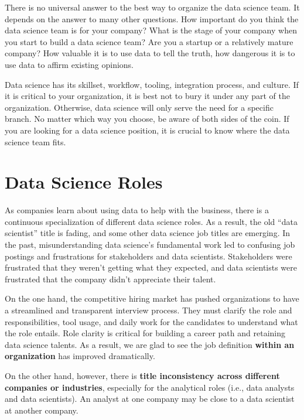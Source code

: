 \documentclass[
  12pt,
]{krantz}
\begin{document}
There is no universal answer to the best way to organize the data science team. It depends on the answer to many other questions. How important do you think the data science team is for your company? What is the stage of your company when you start to build a data science team? Are you a startup or a relatively mature company? How valuable it is to use data to tell the truth, how dangerous it is to use data to affirm existing opinions.

Data science has its skillset, workflow, tooling, integration process, and culture. If it is critical to your organization, it is best not to bury it under any part of the organization. Otherwise, data science will only serve the need for a specific branch. No matter which way you choose, be aware of both sides of the coin. If you are looking for a data science position, it is crucial to know where the data science team fits.

\hypertarget{data-science-roles}{%
\section{Data Science Roles}\label{data-science-roles}}

As companies learn about using data to help with the business, there is a continuous specialization of different data science roles. As a result, the old ``data scientist'' title is fading, and some other data science job titles are emerging. In the past, misunderstanding data science's fundamental work led to confusing job postings and frustrations for stakeholders and data scientists. Stakeholders were frustrated that they weren't getting what they expected, and data scientists were frustrated that the company didn't appreciate their talent.

On the one hand, the competitive hiring market has pushed organizations to have a streamlined and transparent interview process. They must clarify the role and responsibilities, tool usage, and daily work for the candidates to understand what the role entails. Role clarity is critical for building a career path and retaining data science talents. As a result, we are glad to see the job definition \textbf{within an organization} has improved dramatically.

On the other hand, however, there is \textbf{title inconsistency across different companies or industries}, especially for the analytical roles (i.e., data analysts and data scientists). An analyst at one company may be close to a data scientist at another company.
\end{document}
